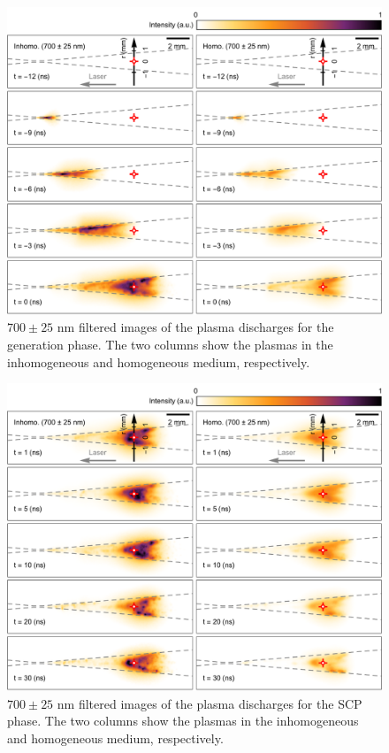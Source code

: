 \begin{figure}[ht!]
\centering
\includegraphics[width=130mm]{figures/ch4/imaging/700gen.pdf}
\caption{$700\pm25 \text{ nm}$ filtered images of the plasma discharges for the generation phase. The two columns show the plasmas in the inhomogeneous and homogeneous medium, respectively.}
\label{fig:700gen}
\end{figure}

\begin{figure}[ht!]
\centering
\includegraphics[width=130mm]{figures/ch4/imaging/700SCP.pdf}
\caption{$700\pm25 \text{ nm}$ filtered images of the plasma discharges for the SCP phase. The two columns show the plasmas in the inhomogeneous and homogeneous medium, respectively.}
\label{fig:700SCP}
\end{figure}

